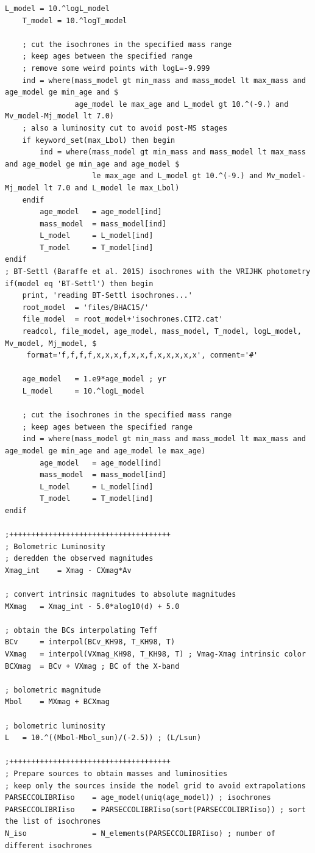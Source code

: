 \documentclass[12pt]{article}
\begin{document}
{\begin{Verbatim}[tabsize=4]
	L_model	= 10.^logL_model
	T_model	= 10.^logT_model
	
	; cut the isochrones in the specified mass range
	; keep ages between the specified range
	; remove some weird points with logL=-9.999
	ind	= where(mass_model gt min_mass and mass_model lt max_mass and age_model ge min_age and $
				age_model le max_age and L_model gt 10.^(-9.) and Mv_model-Mj_model lt 7.0)
	; also a luminosity cut to avoid post-MS stages
	if keyword_set(max_Lbol) then begin
		ind = where(mass_model gt min_mass and mass_model lt max_mass and age_model ge min_age and age_model $
					le max_age and L_model gt 10.^(-9.) and Mv_model-Mj_model lt 7.0 and L_model le max_Lbol)
	endif
		age_model	= age_model[ind]
		mass_model	= mass_model[ind]
		L_model		= L_model[ind]
		T_model		= T_model[ind]
endif
; BT-Settl (Baraffe et al. 2015) isochrones with the VRIJHK photometry
if(model eq 'BT-Settl') then begin
	print, 'reading BT-Settl isochrones...'
	root_model	= 'files/BHAC15/'
	file_model	= root_model+'isochrones.CIT2.cat'
	readcol, file_model, age_model, mass_model, T_model, logL_model, Mv_model, Mj_model, $
	 format='f,f,f,f,x,x,x,f,x,x,f,x,x,x,x,x', comment='#'
	
	age_model	= 1.e9*age_model ; yr
	L_model		= 10.^logL_model 

	; cut the isochrones in the specified mass range
	; keep ages between the specified range
	ind	= where(mass_model gt min_mass and mass_model lt max_mass and age_model ge min_age and age_model le max_age)
		age_model	= age_model[ind]
		mass_model	= mass_model[ind]
		L_model		= L_model[ind]
		T_model		= T_model[ind]
endif

;+++++++++++++++++++++++++++++++++++++
; Bolometric Luminosity
; deredden the observed magnitudes
Xmag_int	= Xmag - CXmag*Av

; convert intrinsic magnitudes to absolute magnitudes
MXmag	= Xmag_int - 5.0*alog10(d) + 5.0

; obtain the BCs interpolating Teff
BCv		= interpol(BCv_KH98, T_KH98, T)
VXmag	= interpol(VXmag_KH98, T_KH98, T) ; Vmag-Xmag intrinsic color
BCXmag	= BCv + VXmag ; BC of the X-band

; bolometric magnitude
Mbol	= MXmag + BCXmag

; bolometric luminosity
L	= 10.^((Mbol-Mbol_sun)/(-2.5)) ; (L/Lsun)

;+++++++++++++++++++++++++++++++++++++
; Prepare sources to obtain masses and luminosities
; keep only the sources inside the model grid to avoid extrapolations
PARSECCOLIBRIiso	= age_model(uniq(age_model)) ; isochrones
PARSECCOLIBRIiso	= PARSECCOLIBRIiso(sort(PARSECCOLIBRIiso)) ; sort the list of isochrones
N_iso				= N_elements(PARSECCOLIBRIiso) ; number of different isochrones


\end{Verbatim}}
\end{document}
